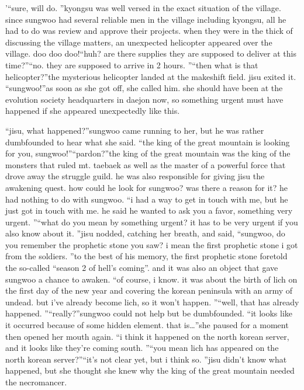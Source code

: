 ’“sure, will do.
”kyongsu was well versed in the exact situation of the village.
 since sungwoo had several reliable men in the village including kyongsu, all he had to do was review and approve their projects.
when they were in the thick of discussing the village matters, an unexpected helicopter appeared over the village.
doo doo doo!“huh? are there supplies they are supposed to deliver at this time?”“no.
 they are supposed to arrive in 2 hours.
”“then what is that helicopter?”the mysterious helicopter landed at the makeshift field.
 jisu exited it.
“sungwoo!”as soon as she got off, she called him.
 she should have been at the evolution society headquarters in daejon now, so something urgent must have happened if she appeared unexpectedly like this.


“jisu, what happened?”sungwoo came running to her, but he was rather dumbfounded to hear what she said.
“the king of the great mountain is looking for you, sungwoo!”“pardon?”the king of the great mountain was the king of the monsters that ruled mt.
 taebaek as well as the master of a powerful force that drove away the struggle guild.
 he was also responsible for giving jisu the awakening quest.
how could he look for sungwoo? was there a reason for it? he had nothing to do with sungwoo.
“i had a way to get in touch with me, but he just got in touch with me.
 he said he wanted to ask you a favor, something very urgent.
”“what do you mean by something urgent? it has to be very urgent if you also know about it.
”jisu nodded, catching her breath, and said, “sungwoo, do you remember the prophetic stone you saw? i mean the first prophetic stone i got from the soldiers.
”to the best of his memory, the first prophetic stone foretold the so-called “season 2 of hell’s coming”.
 and it was also an object that gave sungwoo a chance to awaken.
“of course, i know.
 it was about the birth of lich on the first day of the new year and covering the korean peninsula with an army of undead.
 but i’ve already become lich, so it won’t happen.
”“well, that has already happened.
”“really?”sungwoo could not help but be dumbfounded.
“it looks like it occurred because of some hidden element.
 that is…”she paused for a moment then opened her mouth again.
“i think it happened on the north korean server, and it looks like they’re coming south.
”“you mean lich has appeared on the north korean server?”“it’s not clear yet, but i think so.
”jisu didn’t know what happened, but she thought she knew why the king of the great mountain needed the necromancer.


 